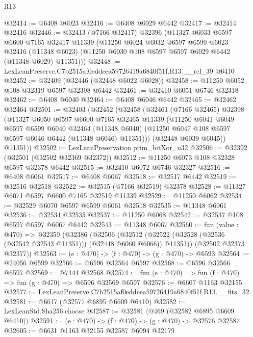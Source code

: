\begin{lexlean}{R13}
\begin{coremodule}
@32414 := @6408 @6023
@32416 := @6408 @6029 @6442
@32417 := @32414 @32416
@32446 := @32413
    (@7166 @32417)
    @32396
    (@11327
      @6033
      @6597
      @6600
      @7165
      @32417
      @11339
      (@11250
        @6024
        @6032
        @6597
        @6599
        @6023
        @32416
        (@11348 @6023)
        (@11250 @6030 @108 @6597 @6597 @6029 @6442 (@11348 @6029) @11351)))
@32448 := LexLeanPreserve.C7b2515af0eddeea59726419a6840f51f.R13.__rel_39 @6410
@32452 := @32409 (@32446 (@32448 @6022 @6028))
@32458 := @11250 @6052 @108 @32319 @6597 @32398 @6442
@32461 := @32410 @6051 @6746 @32318
@32462 := @6408 @6040
@32464 := @6408 @6046 @6442
@32465 := @32462 @32464
@32501 := @32403
    (@32452
      (@32458
        (@32461
          (@7166 @32465)
          @32398
          (@11327
            @6050
            @6597
            @6600
            @7165
            @32465
            @11339
            (@11250
              @6041
              @6049
              @6597
              @6599
              @6040
              @32464
              (@11348 @6040)
              (@11250 @6047 @108 @6597 @6597 @6046 @6442 (@11348 @6046) @11351)))
          (@32448 @6039 @6045))
        @11351))
@32502 := LexLeanPreservation.prim_bitXor_u32
@32506 := @32392 (@32501 (@32502 @32369 @32372))
@32512 := @11250 @6073 @108 @32328 @6597 @32378 @6442
@32515 := @32410 @6072 @6746 @32327
@32516 := @6408 @6061
@32517 := @6408 @6067
@32518 := @32517 @6442
@32519 := @32516 @32518
@32522 := @32515 (@7166 @32519) @32378
@32528 := @11327 @6071 @6597 @6600 @7165 @32519 @11339
@32529 := @11250 @6062
@32534 := @32529 @6070 @6597 @6599 @6061 @32518
@32535 := @11348 @6061
@32536 := @32534 @32535
@32537 := @11250 @6068
@32542 := @32537 @108 @6597 @6597 @6067 @6442
@32543 := @11348 @6067
@32560 := fun (value : @470) =>
  @32359
    (@32386
      (@32506
        (@32512 (@32522 (@32528 (@32536 (@32542 @32543 @11351))) (@32448 @6060 @6066)) @11351))
      (@32502 @32373 @32377))
@32563 := (e : @470) -> (f : @470) -> (g : @470) -> @6593
@32564 := @24056 @6599
@32566 := @6596 @32564 @6597
@32568 := @6596 @32566 @6597
@32569 := @7144 @32568
@32574 := fun (e : @470) => fun (f : @470) => fun (g : @470) => @6596 @32569 @6597
@32576 := @6607 @1163 @32155
@32577 := LexLeanPreserve.C7b2515af0eddeea59726419a6840f51f.R13.__fits_32
@32581 := @6617 (@32577 @6895 @6609 @6410)
@32582 := LexLeanStd.Sha256.choose
@32587 := @32581 (@469 (@32582 @6895 @6609 @6410))
@32591 := (e : @470) -> (f : @470) -> (g : @470) -> @32576 @32587
@32605 := @6631
    @1163
    @32155
    @32587
    @6094
    @32179

\end{coremodule}
\end{lexlean}
